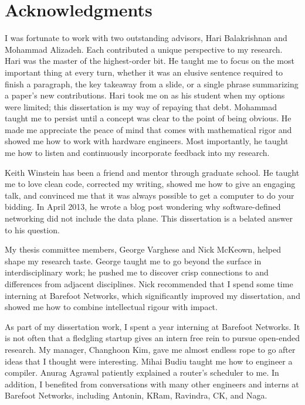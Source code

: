 \chapter*{Acknowledgments}
%

I was fortunate to work with two outstanding advisors, Hari Balakrishnan and
Mohammad Alizadeh. Each contributed a unique perspective to my research.  Hari
was the master of the highest-order bit. He taught me to focus on the most
important thing at every turn, whether it was an elusive sentence required to
finish a paragraph, the key takeaway from a slide, or a single phrase
summarizing a paper's new contributions. Hari took me on as his student when my
options were limited; this dissertation is my way of repaying that debt.
Mohammad taught me to persist until a concept was clear to the point of being
obvious. He made me appreciate the peace of mind that comes with mathematical
rigor and showed me how to work with hardware engineers.  Most importantly, he
taught me how to listen and continuously incorporate feedback into my research.

Keith Winstein has been a friend and mentor through graduate school. He taught
me to love clean code, corrected my writing, showed me how to give an engaging
talk, and convinced me that it was always possible to get a computer to do your
bidding. In April 2013, he wrote a blog post wondering why software-defined
networking did not include the data plane. This dissertation is a belated
answer to his question.

My thesis committee members, George Varghese and Nick McKeown, helped shape my
research taste. George taught me to go beyond the surface in interdisciplinary
work; he pushed me to discover crisp connections to and differences from adjacent
disciplines. Nick recommended that I spend some time interning at Barefoot
Networks, which significantly improved my dissertation, and showed me how to
combine intellectual rigour with impact.

As part of my dissertation work, I spent a year interning at Barefoot Networks.
It is not often that a fledgling startup gives an intern free rein to pursue
open-ended research. My manager, Changhoon Kim, gave me almost endless rope to
go after ideas that I thought were interesting. Mihai Budiu taught me how to
engineer a compiler. Anurag Agrawal patiently explained a router's scheduler to
me. In addition, I benefited from conversations with many other engineers and
interns at Barefoot Networks, including Antonin, KRam, Ravindra, CK, and Naga.

